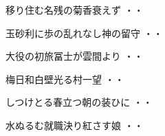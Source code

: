 \begin{shiika}移り住む名残の菊香衰えず
\hfill{・・}\end{shiika}
\vspace{0.6cm}
\begin{shiika}玉砂利に歩の乱れなし神の留守
\hfill{・・}\end{shiika}
\vspace{0.6cm}
\begin{shiika}大役の初旅冨士が雲間より
\hfill{・・}\end{shiika}
\vspace{0.6cm}
\begin{shiika}梅日和白壁光る村一望
\hfill{・・}\end{shiika}
\vspace{0.6cm}
\begin{shiika}しつけとる春立つ朝の装ひに
\hfill{・・}\end{shiika}
\vspace{0.6cm}
\begin{shiika}水ぬるむ就職決り紅さす娘
\hfill{・・}\end{shiika}
\vspace{0.6cm}


